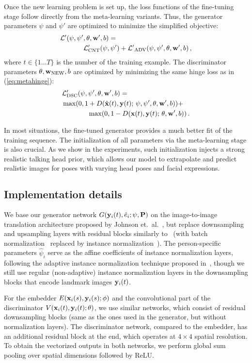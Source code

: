 \documentclass[10pt,twocolumn,letterpaper]{article}
\newcommand{\eq}[1]{(\ref{eq:#1})}
\newcommand{\e}{e}
\begin{document}
Once the new learning problem is set up, the loss functions of the fine-tuning stage follow directly from the meta-learning variants. Thus, the generator parameters $\psi$ and $\psi'$ are optimized to minimize the simplified objective:
\begin{align} \label{eq:finetune}
    \mathcal{L}'(\psi,\psi'&,\theta,\mathbf{w}',b) = \\ &\mathcal{L}_\text{CNT}'(\psi,\psi') +
    \mathcal{L'}_\text{ADV}{}(\psi,\psi',\theta,\mathbf{w}',b) \,,\nonumber
\end{align}
where $t \in \{1\dots T\}$ is the number of the training example. The discriminator parameters $\theta,\mathbf{w}_\text{NEW},b$ are optimized by minimizing the same hinge loss as in \eq{metahinge}:
\begin{align}
   &\mathcal{L}'_\text{DSC}(\psi,\psi',\theta,\mathbf{w}',b) =\\     &\max(0,1+D(\hat{\mathbf{x}}(t),\mathbf{y}(t);\,\psi,\psi',\theta,\mathbf{w}',b)) +\nonumber\\
   &\qquad\qquad\!\max(0,1-D(\mathbf{x}(t),\mathbf{y}(t);\,\theta,\mathbf{w}',b))\,.\nonumber
\end{align}

In most situations, the fine-tuned generator provides a much better fit of the training sequence. The initialization of all parameters via the meta-learning stage is also crucial. As we show in the experiments, such initialization injects a strong realistic talking head prior, which allows our model to extrapolate and predict realistic images for poses with varying head poses and facial expressions.

\subsection{Implementation details}

We base our generator network $G(\y_i(t), \hat\e_i; \psi, \P)$ on the image-to-image translation architecture proposed by Johnson et.\ al.~\cite{Johnson16}, but replace downsampling and upsampling layers with residual blocks similarly to~\cite{Brock18} (with batch normalization~\cite{Ioffe15} replaced by instance normalization~\cite{Ulyanov16}). The person-specific parameters $\hat\psi_i$ serve as the affine coefficients of instance normalization layers, following the adaptive instance normalization technique proposed in~\cite{Huang17}, though we still use regular (non-adaptive) instance normalization layers in the downsampling blocks that encode landmark images $\mathbf{y}_i(t)$.

For the embedder $E(\mathbf{x}_i(s), \mathbf{y}_i(s); \phi)$ and the convolutional part of the discriminator $V(\mathbf{x}_i(t), \mathbf{y}_i(t); \theta)$, we use similar networks, which consist of residual downsampling blocks (same as the ones used in the generator, but without normalization layers). The discriminator network, compared to the embedder, has an additional residual block at the end, which operates at $4\times4$ spatial resolution. To obtain the vectorized outputs in both networks, we perform global sum pooling over spatial dimensions followed by ReLU. 
\end{document}
